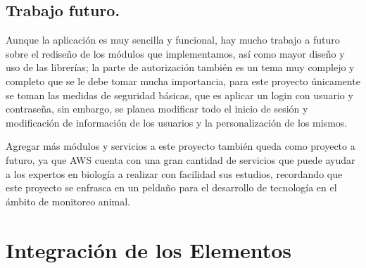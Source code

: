 \subsection{Trabajo futuro.}

Aunque la aplicación es muy sencilla y funcional, hay mucho trabajo a futuro sobre el rediseño de los módulos que implementamos, así como mayor diseño y uso de las librerías; la parte de autorización también es un tema muy complejo y completo que se le debe tomar mucha importancia, para este proyecto únicamente se toman las medidas de seguridad básicas, que es aplicar un login con usuario y contraseña, sin embargo, se planea modificar todo el inicio de sesión y modificación de información de los usuarios y la personalización de los mismos.

Agregar más módulos y servicios a este proyecto también queda como proyecto a futuro, ya que AWS cuenta con una gran cantidad de servicios que puede ayudar a los expertos en biología a realizar con facilidad sus estudios, recordando que este proyecto se enfrasca en un peldaño para el desarrollo de tecnología en el ámbito de monitoreo animal.

\section{Integración de los Elementos}


